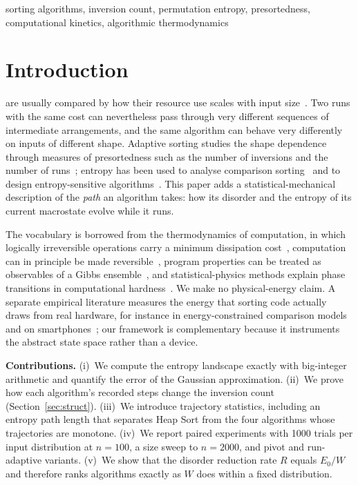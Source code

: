 \documentclass[10pt,journal]{IEEEtran}
\begin{document}
\begin{IEEEkeywords}
sorting algorithms, inversion count, permutation entropy, presortedness, computational kinetics, algorithmic thermodynamics
\end{IEEEkeywords}

\section{Introduction}
 are usually compared by how their resource use scales with input size~\cite{ref1}. Two runs with the same cost can nevertheless pass through very different sequences of intermediate arrangements, and the same algorithm can behave very differently on inputs of different shape. Adaptive sorting studies the shape dependence through measures of presortedness such as the number of inversions and the number of runs~\cite{ref33,ref34}; entropy has been used to analyse comparison sorting~\cite{ref4,ref6,ref7} and to design entropy-sensitive algorithms~\cite{ref5}. This paper adds a statistical-mechanical description of the \emph{path} an algorithm takes: how its disorder and the entropy of its current macrostate evolve while it runs.

The vocabulary is borrowed from the thermodynamics of computation, in which logically irreversible operations carry a minimum dissipation cost~\cite{ref9}, computation can in principle be made reversible~\cite{ref10}, program properties can be treated as observables of a Gibbs ensemble~\cite{ref11}, and statistical-physics methods explain phase transitions in computational hardness~\cite{ref12}. We make no physical-energy claim. A separate empirical literature measures the energy that sorting code actually draws from real hardware, for instance in energy-constrained comparison models~\cite{ref21} and on smartphones~\cite{ref22}; our framework is complementary because it instruments the abstract state space rather than a device.

\textbf{Contributions.} (i)~We compute the entropy landscape exactly with big-integer arithmetic and quantify the error of the Gaussian approximation. (ii)~We prove how each algorithm's recorded steps change the inversion count (Section~\ref{sec:struct}). (iii)~We introduce trajectory statistics, including an entropy path length that separates Heap Sort from the four algorithms whose trajectories are monotone. (iv)~We report paired experiments with 1000 trials per input distribution at $n=100$, a size sweep to $n=2000$, and pivot and run-adaptive variants. (v)~We show that the disorder reduction rate $R$ equals $E_0/W$ and therefore ranks algorithms exactly as $W$ does within a fixed distribution.
\end{document}
